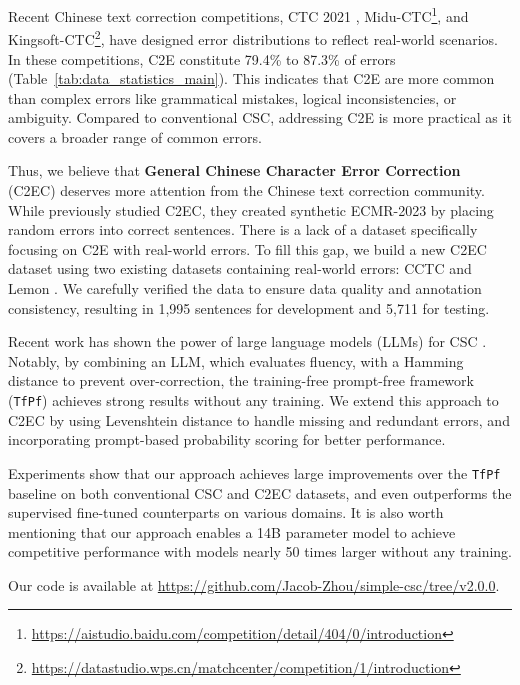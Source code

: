 Recent Chinese text correction competitions, CTC 2021 \cite{zhao-etal-2022-overview}, Midu-CTC\footnote{\url{https://aistudio.baidu.com/competition/detail/404/0/introduction}}, and Kingsoft-CTC\footnote{\url{https://datastudio.wps.cn/matchcenter/competition/1/introduction}}, have designed error distributions to reflect real-world scenarios.
In these competitions, C2E constitute 79.4\% to 87.3\% of errors (Table~\ref{tab:data_statistics_main}).
This indicates that C2E are more common than complex errors like grammatical mistakes, logical inconsistencies, or ambiguity.
Compared to conventional CSC, addressing C2E is more practical as it covers a broader range of common errors.

Thus, we believe that \textbf{General Chinese Character Error Correction} (C2EC) deserves more attention from the Chinese text correction community.
While \citet{he-etal-2023-umrspell} previously studied C2EC, they created synthetic ECMR-2023 by placing random errors into correct sentences.
There is a lack of a dataset specifically focusing on C2E with real-world errors.
To fill this gap, we build a new C2EC dataset using two existing datasets containing real-world errors: CCTC \cite{wang-etal-2022-cctc} and Lemon \cite{wu-etal-2023-rethinking}.
We carefully verified the data to ensure data quality and annotation consistency, resulting in 1,995 sentences for development and 5,711 for testing.

Recent work has shown the power of large language models (LLMs) for CSC \cite{dong-etal-2024-rich,li-etal-2024-cllm,zhou-etal-2024-simple}.
Notably, by combining an LLM, which evaluates fluency, with a Hamming distance to prevent over-correction, the training-free prompt-free framework (\texttt{TfPf}) \cite{zhou-etal-2024-simple} achieves strong results without any training.
We extend this approach to C2EC by using Levenshtein distance to handle missing and redundant errors, and incorporating prompt-based probability scoring for better performance.

Experiments show that our approach achieves large improvements over the \texttt{TfPf} baseline on both conventional CSC and C2EC datasets, and even outperforms the supervised fine-tuned counterparts on various domains.
It is also worth mentioning that our approach enables a 14B parameter model to achieve competitive performance with models nearly 50 times larger without any training.


Our code is available at \url{https://github.com/Jacob-Zhou/simple-csc/tree/v2.0.0}.
